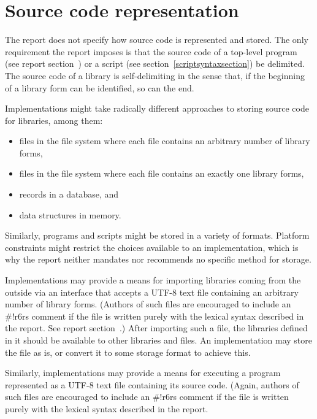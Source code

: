 \chapter{Source code representation}
\label{sourcecoderepappendix}

The report does not specify how source code is represented and stored.
The only requirement the report imposes is that the source code of a
top-level program (see report
section~) or a script (see section~\ref{scriptsyntaxsection}) be
delimited.  The source code of a library is self-delimiting in the
sense that, if the beginning of a library form can be identified, so
can the end.

Implementations might take radically different approaches to storing
source code for libraries, among them:
%
\begin{itemize}
\item files in the file system where each file contains an
  arbitrary number of library forms,
\item files in the file system where each file contains an
  exactly one library forms,
\item records in a database, and
\item data structures in memory.
\end{itemize}
%
Similarly, programs and scripts might be stored in a variety of
formats.  Platform constraints might restrict the choices available to
an implementation, which is why the report neither mandates nor
recommends no specific method for storage.

Implementations may provide a means for importing libraries coming from
the outside via an interface that accepts a UTF-8 text file containing
an arbitrary number of library forms.  (Authors of such files are
encouraged to include an {\cf\#!r6rs} comment if the file is written
purely with the lexical syntax described in the report.  See report
section~.)  After importing such a file, the libraries defined in
it should be available to other libraries and files.  An
implementation may store the file as is, or convert it to some storage
format to achieve this.

Similarly, implementations may provide a means for executing a program
represented as a UTF-8 text file containing its source code.  (Again,
authors of such files are encouraged to include an {\cf\#!r6rs}
comment if the file is written purely with the lexical syntax
described in the report.

